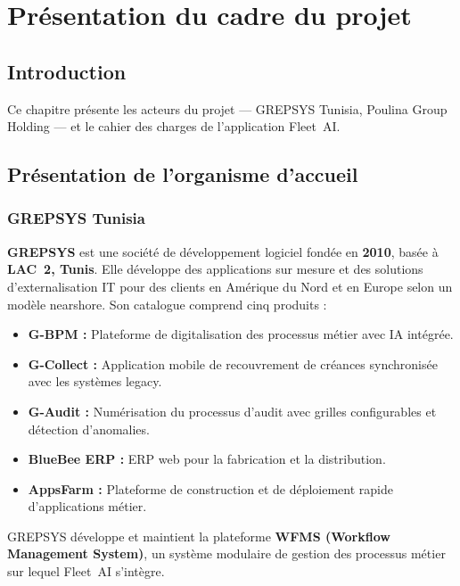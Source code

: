 \chapter{Présentation du cadre du projet}

\section*{Introduction}
Ce chapitre présente les acteurs du projet --- GREPSYS Tunisia, Poulina Group Holding --- et le cahier des charges de l'application Fleet~AI.

\section{Présentation de l'organisme d'accueil}

\subsection{GREPSYS Tunisia}
\textbf{GREPSYS} est une société de développement logiciel fondée en \textbf{2010}, basée à \textbf{LAC~2, Tunis}. Elle développe des applications sur mesure et des solutions d'externalisation IT pour des clients en Amérique du Nord et en Europe selon un modèle nearshore. Son catalogue comprend cinq produits :
\begin{itemize}
    \item[$\bullet$] \textbf{G-BPM :} Plateforme de digitalisation des processus métier avec IA intégrée.
    \item[$\bullet$] \textbf{G-Collect :} Application mobile de recouvrement de créances synchronisée avec les systèmes legacy.
    \item[$\bullet$] \textbf{G-Audit :} Numérisation du processus d'audit avec grilles configurables et détection d'anomalies.
    \item[$\bullet$] \textbf{BlueBee ERP :} ERP web pour la fabrication et la distribution.
    \item[$\bullet$] \textbf{AppsFarm :} Plateforme de construction et de déploiement rapide d'applications métier.
\end{itemize}

GREPSYS développe et maintient la plateforme \textbf{WFMS (Workflow Management System)}, un système modulaire de gestion des processus métier sur lequel Fleet~AI s'intègre.

